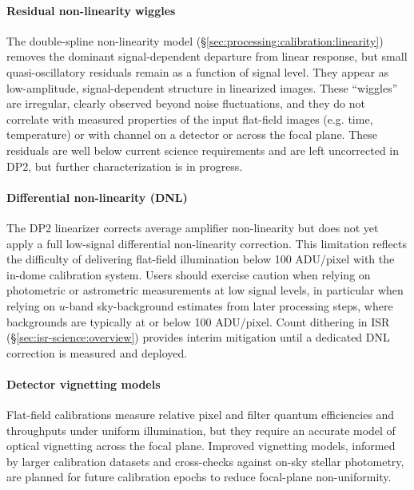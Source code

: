 \paragraph{Residual non-linearity wiggles}
The double-spline non-linearity model (\S\ref{sec:processing:calibration:linearity}) removes the dominant signal-dependent departure from linear response, but small quasi-oscillatory residuals remain as a function of signal level.
They appear as low-amplitude, signal-dependent structure in linearized images.
These ``wiggles'' are irregular, clearly observed beyond noise fluctuations, and they do not correlate with measured properties of the input flat-field images (e.g. time, temperature) or with channel on a detector or across the focal plane.
These residuals are well below current science requirements and are left uncorrected in DP2, but further characterization is in progress.

\paragraph{Differential non-linearity (DNL)}
The DP2 linearizer corrects average amplifier non-linearity but does not yet apply a full low-signal differential non-linearity correction.
This limitation reflects the difficulty of delivering flat-field illumination below 100 ADU/pixel with the in-dome calibration system.
Users should exercise caution when relying on photometric or astrometric measurements at low signal levels, in particular when relying on $u$-band sky-background estimates from later processing steps, where backgrounds are typically at or below 100 ADU/pixel.
Count dithering in ISR (\S\ref{sec:isr-science:overview}) provides interim mitigation until a dedicated DNL correction is measured and deployed.

\paragraph{Detector vignetting models}
Flat-field calibrations measure relative pixel and filter quantum efficiencies and throughputs under uniform illumination, but they require an accurate model of optical vignetting across the focal plane.
Improved vignetting models, informed by larger calibration datasets and cross-checks against on-sky stellar photometry, are planned for future calibration epochs to reduce focal-plane non-uniformity.

